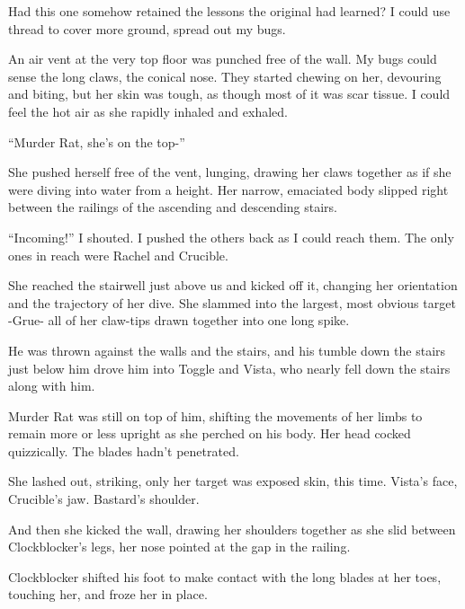 Had this one somehow retained the lessons the original had learned?  I could use thread to cover more ground, spread out my bugs.



An air vent at the very top floor was punched free of the wall.  My bugs could sense the long claws, the conical nose.  They started chewing on her, devouring and biting, but her skin was tough, as though most of it was scar tissue.  I could feel the hot air as she rapidly inhaled and exhaled.



``Murder Rat, she's on the top-''



She pushed herself free of the vent, lunging, drawing her claws together as if she were diving into water from a height.  Her narrow, emaciated body slipped right between the railings of the ascending and descending stairs.



``Incoming!'' I shouted.  I pushed the others back as I could reach them.  The only ones in reach were Rachel and Crucible.



She reached the stairwell just above us and kicked off it, changing her orientation and the trajectory of her dive.  She slammed into the largest, most obvious target -Grue- all of her claw-tips drawn together into one long spike.



He was thrown against the walls and the stairs, and his tumble down the stairs just below him drove him into Toggle and Vista, who nearly fell down the stairs along with him.



Murder Rat was still on top of him, shifting the movements of her limbs to remain more or less upright as she perched on his body.  Her head cocked quizzically.  The blades hadn't penetrated.



She lashed out, striking, only her target was exposed skin, this time.  Vista's face, Crucible's jaw.  Bastard's shoulder.



And then she kicked the wall, drawing her shoulders together as she slid between Clockblocker's legs, her nose pointed at the gap in the railing.



Clockblocker shifted his foot to make contact with the long blades at her toes, touching her, and froze her in place.



